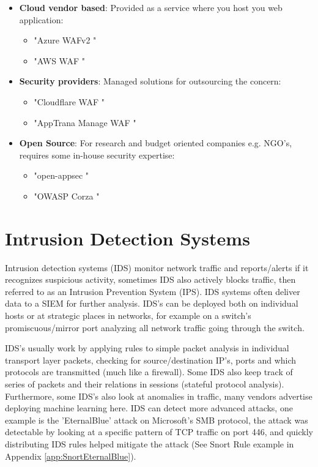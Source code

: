 \documentclass[
	letterpaper, %
	10pt, %
	unnumberedsections, %
	twoside, %
]{APAAssignment}
\begin{document}
\begin{itemize}
	
	\item{\textbf{Cloud vendor based}: Provided as a service where you host you web application: 
	\begin{itemize}
		\item "Azure WAFv2 \cite{AzureWAF}"
		\item "AWS WAF \cite{AWSWAF}"
	\end{itemize}
	}
	
	\item{\textbf{Security providers}: Managed solutions for outsourcing the concern:
	\begin{itemize}
		\item "Cloudflare WAF \cite{CloudflareWAF}"
		\item "AppTrana Manage WAF \cite{AppTrana-WAF}"
	\end{itemize}
	}
	
	\item{
		\textbf{Open Source}: For research and budget oriented companies e.g. NGO's, requires some in-house security expertise: 
		\begin{itemize}
			\item "open-appsec \cite{open-appsec}"
			\item "OWASP Corza \cite{OWASPcorsa}"
		\end{itemize}
	} 
\end{itemize}


\section{Intrusion Detection Systems}
Intrusion detection systems (IDS) monitor network traffic and reports/alerts if it recognizes suspicious activity, sometimes IDS also actively blocks traffic, then referred to as an Intrusion Prevention System (IPS). IDS systems often deliver data to a SIEM for further analysis. IDS's can be deployed both on individual hosts or at strategic places in networks, for example on a switch's promiscuous/mirror port analyzing all network traffic going through the switch. 

IDS's usually work by applying rules to simple packet analysis in individual transport layer packets, checking for source/destination IP's, ports and which protocols are transmitted (much like a firewall). Some IDS also keep track of series of packets and their relations in sessions (stateful protocol analysis). Furthermore, some IDS's also look at anomalies in traffic, many vendors advertise deploying machine learning here. IDS can detect more advanced attacks, one example is the 'EternalBlue' attack on Microsoft's SMB protocol, the attack was detectable by looking at a specific pattern of TCP traffic on port 446, and quickly distributing IDS rules helped mitigate the attack (See Snort Rule example in Appendix \ref{app:SnortEternalBlue}). 
\end{document}
